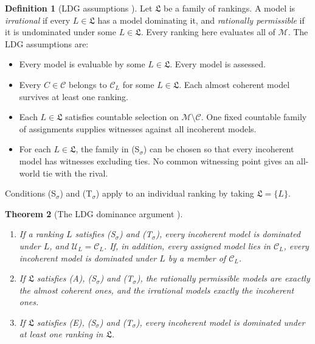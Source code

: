 \documentclass[11pt]{article}
\newtheorem{theorem}{Theorem}[section]
\theoremstyle{definition}
\newtheorem{definition}[theorem]{Definition}
\newcommand{\M}{\mathcal M}
\newcommand{\C}{\mathcal C}
\newcommand{\U}{\mathcal U}
\newcommand{\Lf}{\mathfrak L}
\begin{document}
\begin{definition}[LDG assumptions {\cite{LDG}}]\label{def:argument}
Let $\Lf$ be a family of rankings. A model is \emph{irrational} if every $L\in\Lf$ has a model dominating it, and \emph{rationally permissible} if it is undominated under some $L\in\Lf$. Every ranking here evaluates all of $\M$. The LDG assumptions are:
\begin{itemize}[leftmargin=3.4em,labelsep=0.5em]
\item[\textbf{(E)}] Every model is evaluable by some $L\in\Lf$. Every model is assessed.
\item[\textbf{(A)}] Every $C\in\C$ belongs to $\C_L$ for some $L\in\Lf$. Each almost coherent model survives at least one ranking.
\item[\textbf{(S$_\sigma$)}] Each $L\in\Lf$ satisfies countable selection on $\M\setminus\C$. One fixed countable family of assignments supplies witnesses against all incoherent models.
\item[\textbf{(T$_\sigma$)}] For each $L\in\Lf$, the family in (S$_\sigma$) can be chosen so that every incoherent model has witnesses excluding ties. No common witnessing point gives an all-world tie with the rival.
\end{itemize}
Conditions (S$_\sigma$) and (T$_\sigma$) apply to an individual ranking by taking $\Lf=\{L\}$.
\end{definition}

\begin{theorem}[The LDG dominance argument {\cite{LDG}}]\label{thm:LDGargument}
\begin{enumerate}[label=(\alph*)]
\item If a ranking $L$ satisfies (S$_\sigma$) and (T$_\sigma$), every incoherent model is dominated under $L$, and $\U_L=\C_L$. If, in addition, every assigned model lies in $\C_L$, every incoherent model is dominated under $L$ by a member of $\C_L$.
\item If $\Lf$ satisfies (A), (S$_\sigma$) and (T$_\sigma$), the rationally permissible models are exactly the almost coherent ones, and the irrational models exactly the incoherent ones.
\item If $\Lf$ satisfies (E), (S$_\sigma$) and (T$_\sigma$), every incoherent model is dominated under at least one ranking in $\Lf$.
\end{enumerate}
\end{theorem}
\end{document}
